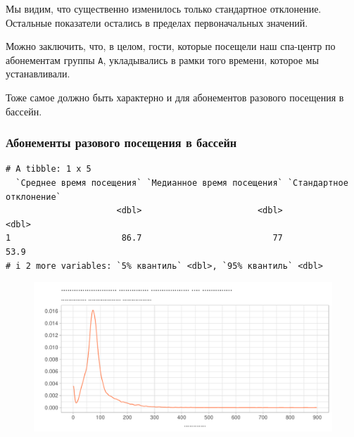 \documentclass[
  letterpaper,
  DIV=11,
  numbers=noendperiod]{scrartcl}
\begin{document}
Мы видим, что существенно изменилось только стандартное отклонение.
Остальные показатели остались в пределах первоначальных значений.

Можно заключить, что, в целом, гости, которые посещели наш спа-центр по
абонементам группы \texttt{А}, укладывались в рамки того времени,
которое мы устанавливали.

Тоже самое должно быть характерно и для абонементов разового посещения в
бассейн.

\hypertarget{ux430ux431ux43eux43dux435ux43cux435ux43dux442ux44b-ux440ux430ux437ux43eux432ux43eux433ux43e-ux43fux43eux441ux435ux449ux435ux43dux438ux44f-ux432-ux431ux430ux441ux441ux435ux439ux43d}{%
\subsubsection*{Абонементы разового посещения в
бассейн}\label{ux430ux431ux43eux43dux435ux43cux435ux43dux442ux44b-ux440ux430ux437ux43eux432ux43eux433ux43e-ux43fux43eux441ux435ux449ux435ux43dux438ux44f-ux432-ux431ux430ux441ux441ux435ux439ux43d}}

\begin{verbatim}
# A tibble: 1 x 5
  `Среднее время посещения` `Медианное время посещения` `Стандартное отклонение`
                      <dbl>                       <dbl>                    <dbl>
1                      86.7                          77                     53.9
# i 2 more variables: `5% квантиль` <dbl>, `95% квантиль` <dbl>
\end{verbatim}

\begin{figure}

{\centering \includegraphics{./intro_files/figure-pdf/unnamed-chunk-26-1.pdf}

}

\end{figure}
\end{document}
